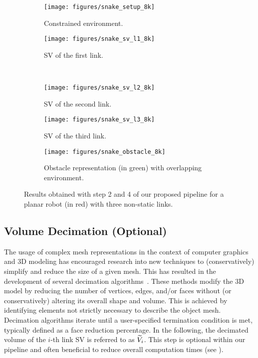 \begin{figure*}
	\centering
	\begin{minipage}{.49\linewidth}
		\begin{subfigure}[t]{.49\linewidth}
			\centering
			\texttt{[image: figures/snake\_setup\_8k]}
			\caption{Constrained environment.}
			\label{fig:snake_robot}
		\end{subfigure}
		\hfill
		\begin{subfigure}[t]{.49\linewidth}
			\centering
			\texttt{[image: figures/snake\_sv\_l1\_8k]}
			\caption{SV of the first link.}
			\label{fig:snake_sv_l1}
		\end{subfigure} \\
		\begin{subfigure}[t]{.49\linewidth}
			\centering
			\texttt{[image: figures/snake\_sv\_l2\_8k]}
			\caption{SV of the second link.}
			\label{fig:snake_sv_l2}
		\end{subfigure}
		\hfill
		\begin{subfigure}[t]{.49\linewidth}
			\centering
			\texttt{[image: figures/snake\_sv\_l3\_8k]}
			\caption{SV of the third link.}
			\label{fig:snake_sv_l3}
		\end{subfigure}		
	\end{minipage}
	\hfill
	\begin{minipage}{.49\linewidth}
		\begin{subfigure}[t]{\linewidth}
			\centering
			\texttt{[image: figures/snake\_obstacle\_8k]}
			\caption{Obstacle representation (in green) with overlapping environment.}
			\label{fig:snake_obstacle_space}
		\end{subfigure}
	\end{minipage}
	\caption{Results obtained with step 2 and 4 of our proposed pipeline for a planar robot (in red) with three non-static links.}
	\label{fig:snake_experiment}
\end{figure*}

\subsection{Volume Decimation (Optional)}
\label{subsec:volumeDecimation}
The usage of complex mesh representations in the context of computer graphics and 
3D modeling has encouraged research into new techniques
to (conservatively) simplify and reduce the size of a given mesh. 
This has resulted in the development of several decimation algorithms~\cite{cignoni1998comparison}.
These methods modify the 3D model by reducing the number of vertices, 
edges, 
and/or faces without (or conservatively) altering its overall shape and volume. 
This is achieved by identifying elements not strictly necessary to describe the object mesh.
Decimation algorithms iterate until a user-specified termination condition is met,
typically defined as a face reduction percentage.
In the following, 
the decimated volume of the $i$-th link SV is referred to as ${\widetilde{V}_{i}}$.
This step is optional within our pipeline 
and often beneficial to reduce overall computation times (see ).

